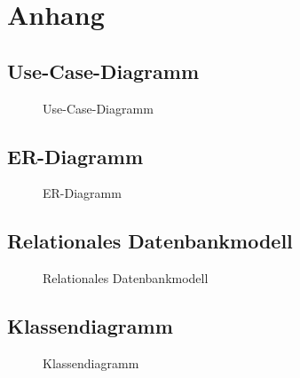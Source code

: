 \section{Anhang}


\clearpage


\clearpage

\subsection{Use-Case-Diagramm}
\label{app:Use-Case-Diagramm}
\begin{figure}[htb]
\centering
{}
\caption{Use-Case-Diagramm}
\end{figure}
\clearpage


\clearpage

\subsection{ER-Diagramm}
\label{app:ER-Diagramm}
\begin{figure}[htb]
\centering
{}
\caption{ER-Diagramm}
\end{figure}
\clearpage

\subsection{Relationales Datenbankmodell}
\label{app:Relationales_Datenbankmodell}
\begin{figure}[htb]
\centering
{}
\caption{Relationales Datenbankmodell}
\end{figure}
\clearpage

\subsection{Klassendiagramm}
\label{app:Klassendiagramm}
\begin{figure}[htb]
\centering
{}
\caption{Klassendiagramm}
\end{figure}
\clearpage


\clearpage

